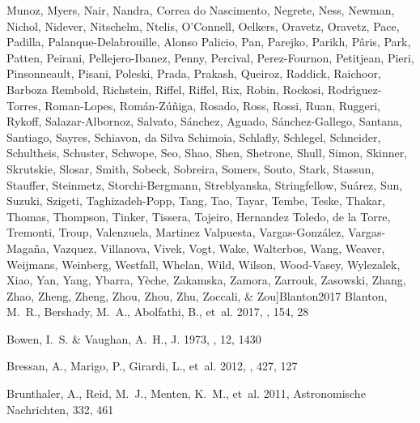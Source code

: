 \documentclass[longauth]{aa} %
\begin{document}
\begin{thebibliography}{112}
{		{Munoz}, {Myers}, {Nair}, {Nandra}, {Correa do Nascimento}, {Negrete},
		{Ness}, {Newman}, {Nichol}, {Nidever}, {Nitschelm}, {Ntelis}, {O'Connell},
		{Oelkers}, {Oravetz}, {Oravetz}, {Pace}, {Padilla}, {Palanque-Delabrouille},
		{Alonso Palicio}, {Pan}, {Parejko}, {Parikh}, {P{\^a}ris}, {Park}, {Patten},
		{Peirani}, {Pellejero-Ibanez}, {Penny}, {Percival}, {Perez-Fournon},
		{Petitjean}, {Pieri}, {Pinsonneault}, {Pisani}, {Poleski}, {Prada},
		{Prakash}, {Queiroz}, {Raddick}, {Raichoor}, {Barboza Rembold}, {Richstein},
		{Riffel}, {Riffel}, {Rix}, {Robin}, {Rockosi}, {Rodr{\'\i}guez-Torres},
		{Roman-Lopes}, {Rom{\'a}n-Z{\'u}{\~n}iga}, {Rosado}, {Ross}, {Rossi}, {Ruan},
		{Ruggeri}, {Rykoff}, {Salazar-Albornoz}, {Salvato}, {S{\'a}nchez}, {Aguado},
		{S{\'a}nchez-Gallego}, {Santana}, {Santiago}, {Sayres}, {Schiavon}, {da Silva
			Schimoia}, {Schlafly}, {Schlegel}, {Schneider}, {Schultheis}, {Schuster},
		{Schwope}, {Seo}, {Shao}, {Shen}, {Shetrone}, {Shull}, {Simon}, {Skinner},
		{Skrutskie}, {Slosar}, {Smith}, {Sobeck}, {Sobreira}, {Somers}, {Souto},
		{Stark}, {Stassun}, {Stauffer}, {Steinmetz}, {Storchi-Bergmann},
		{Streblyanska}, {Stringfellow}, {Su{\'a}rez}, {Sun}, {Suzuki}, {Szigeti},
		{Taghizadeh-Popp}, {Tang}, {Tao}, {Tayar}, {Tembe}, {Teske}, {Thakar},
		{Thomas}, {Thompson}, {Tinker}, {Tissera}, {Tojeiro}, {Hernandez Toledo}, {de
			la Torre}, {Tremonti}, {Troup}, {Valenzuela}, {Martinez Valpuesta},
		{Vargas-Gonz{\'a}lez}, {Vargas-Maga{\~n}a}, {Vazquez}, {Villanova}, {Vivek},
		{Vogt}, {Wake}, {Walterbos}, {Wang}, {Weaver}, {Weijmans}, {Weinberg},
		{Westfall}, {Whelan}, {Wild}, {Wilson}, {Wood-Vasey}, {Wylezalek}, {Xiao},
		{Yan}, {Yang}, {Ybarra}, {Y{\`e}che}, {Zakamska}, {Zamora}, {Zarrouk},
		{Zasowski}, {Zhang}, {Zhao}, {Zheng}, {Zheng}, {Zhou}, {Zhou}, {Zhu},
		{Zoccali}, \& {Zou}}]{Blanton2017}
	{Blanton}, M.~R., {Bershady}, M.~A., {Abolfathi}, B., {et~al.} 2017, \aj, 154,
	28
	
	{Bowen}, I.~S. \& {Vaughan}, A.~H., J. 1973, \ao, 12, 1430
	
	{Bressan}, A., {Marigo}, P., {Girardi}, L., {et~al.} 2012, \mnras, 427, 127
	
	{Brunthaler}, A., {Reid}, M.~J., {Menten}, K.~M., {et~al.} 2011, Astronomische
	Nachrichten, 332, 461
	

\end{thebibliography}
\end{document}
